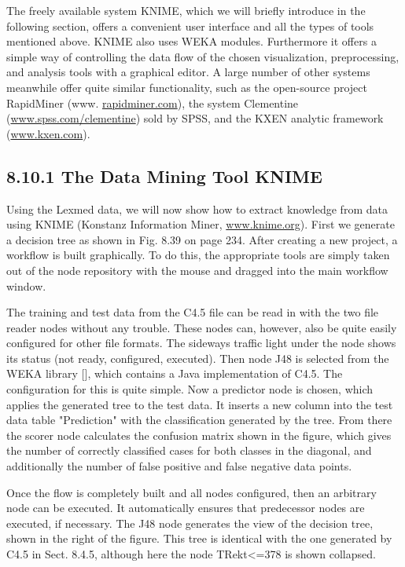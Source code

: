 \documentclass[10pt]{article}
\begin{document}
The freely available system KNIME, which we will briefly introduce in the following section, offers a convenient user interface and all the types of tools mentioned above. KNIME also uses WEKA modules. Furthermore it offers a simple way of controlling the data flow of the chosen visualization, preprocessing, and analysis tools with a graphical editor. A large number of other systems meanwhile offer quite similar functionality, such as the open-source project RapidMiner (www. \href{http://rapidminer.com}{rapidminer.com}), the system Clementine (\href{http://www.spss.com/clementine}{www.spss.com/clementine}) sold by SPSS, and the KXEN analytic framework (\href{http://www.kxen.com}{www.kxen.com}).

\subsection*{8.10.1 The Data Mining Tool KNIME}
Using the Lexmed data, we will now show how to extract knowledge from data using KNIME (Konstanz Information Miner, \href{http://www.knime.org}{www.knime.org}). First we generate a decision tree as shown in Fig. 8.39 on page 234. After creating a new project, a workflow is built graphically. To do this, the appropriate tools are simply taken out of the node repository with the mouse and dragged into the main workflow window.

The training and test data from the C4.5 file can be read in with the two file reader nodes without any trouble. These nodes can, however, also be quite easily configured for other file formats. The sideways traffic light under the node shows its status (not ready, configured, executed). Then node J48 is selected from the WEKA library [\cite{witten2001datamining}], which contains a Java implementation of C4.5. The configuration for this is quite simple. Now a predictor node is chosen, which applies the generated tree to the test data. It inserts a new column into the test data table "Prediction" with the classification generated by the tree. From there the scorer node calculates the confusion matrix shown in the figure, which gives the number of correctly classified cases for both classes in the diagonal, and additionally the number of false positive and false negative data points.

Once the flow is completely built and all nodes configured, then an arbitrary node can be executed. It automatically ensures that predecessor nodes are executed, if necessary. The J48 node generates the view of the decision tree, shown in the right of the figure. This tree is identical with the one generated by C4.5 in Sect. 8.4.5, although here the node TRekt<=378 is shown collapsed.
\end{document}
